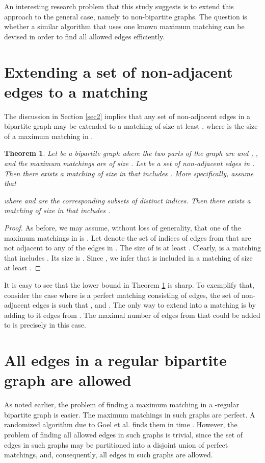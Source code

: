 \documentclass[times, 11pt]{article}
\newtheorem{theorem}{Theorem}[section]
\begin{document}
An interesting research problem that this study suggests is to extend this approach to the general case, namely to non-bipartite graphs.
The question is whether a similar algorithm that uses one known maximum matching
can be devised in order to find all allowed edges efficiently.

\newpage
\appendix
\section{Extending a set of non-adjacent edges to a matching}\label{disc1}
The discussion in Section \ref{sec2} implies that any set of  non-adjacent edges in a bipartite graph may be extended to a matching of size
at least , where  is the size of a maximum matching in .

\begin{theorem}\label{lowb} Let  be a bipartite graph where the two parts of the
graph are  and , , and the maximum matchings are of size .
Let  be a set of  non-adjacent edges in . Then there exists a matching of size  in  that includes .
More specifically, assume that

where  and  are the corresponding subsets of  distinct indices.
Then there exists a matching of size  in  that includes .
\end{theorem}

\begin{proof} As before, we may assume, without loss of generality, that one of the maximum matchings in  is
.
Let  denote the set of indices of edges from  that are not adjacent to any of the edges in .
The size of  is at least .
Clearly,  is a matching that includes . Its size is .
Since , we infer that  is included in a matching of size at least .
\end{proof}

It is easy to see that the lower bound in Theorem \ref{lowb} is sharp. To exemplify that, consider the case where  is a perfect matching consisting of  edges, the set of  non-adjacent
edges  is such that , and . The only way to extend  into a matching is by adding to it edges from . The maximal number
of edges from  that could be added to  is precisely  in this case.

\section{All edges in a regular bipartite graph are allowed}\label{disc2}
As noted earlier, the problem of finding a maximum matching in a -regular bipartite graph is easier. The maximum matchings in such graphs are perfect.
A randomized algorithm due to Goel et al. \cite{GKK10} finds them in time . However, the problem of finding all allowed edges in such graphs is trivial,
since the set of edges in such graphs may be partitioned into a disjoint union of  perfect matchings, and, consequently, all edges in such graphs are allowed.
\end{document}
